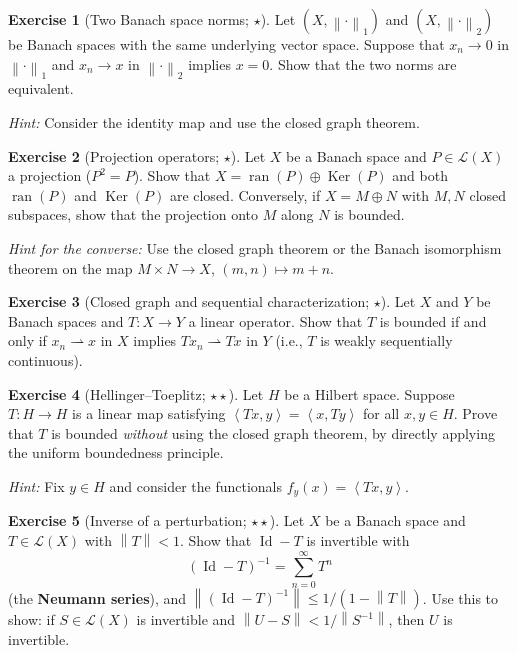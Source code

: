 \documentclass[a4paper,12pt]{book}
\DeclareMathOperator{\Id}{Id}
\DeclareMathOperator{\Ker}{Ker}
\DeclareMathOperator{\ran}{ran}
\newcommand{\norm}[1]{\left\| #1 \right\|}
\newcommand{\inner}[2]{\left\langle #1, #2 \right\rangle}
\newcommand{\weakto}{\rightharpoonup}
\theoremstyle{definition}
\newtheorem{exercise}{Exercise}[chapter]
\theoremstyle{plain}
\theoremstyle{remark}
\begin{document}
\begin{exercise}[Two Banach space norms; $\star$]\label{ex:two-norms}
Let $(X, \norm{\cdot}_1)$ and $(X, \norm{\cdot}_2)$ be Banach spaces with the same
underlying vector space. Suppose that $x_n \to 0$ in $\norm{\cdot}_1$ and
$x_n \to x$ in $\norm{\cdot}_2$ implies $x = 0$. Show that the two norms are
equivalent.

\noindent\textit{Hint:} Consider the identity map and use the closed graph theorem.
\end{exercise}

\begin{exercise}[Projection operators; $\star$]\label{ex:projection}
Let $X$ be a Banach space and $P \in \mathcal{L}(X)$ a projection ($P^2 = P$).
Show that $X = \ran(P) \oplus \Ker(P)$ and both $\ran(P)$ and $\Ker(P)$ are closed.
Conversely, if $X = M \oplus N$ with $M, N$ closed subspaces, show that the
projection onto $M$ along $N$ is bounded.

\noindent\textit{Hint for the converse:} Use the closed graph theorem or the
Banach isomorphism theorem on the map $M \times N \to X$, $(m,n) \mapsto m + n$.
\end{exercise}

\begin{exercise}[Closed graph and sequential characterization; $\star$]%
\label{ex:cgt-sequential}
Let $X$ and $Y$ be Banach spaces and $T \colon X \to Y$ a linear operator.
Show that $T$ is bounded if and only if $x_n \weakto x$ in $X$ implies
$Tx_n \weakto Tx$ in $Y$ (i.e., $T$ is weakly sequentially continuous).
\end{exercise}

\begin{exercise}[Hellinger--Toeplitz; $\star\star$]\label{ex:hellinger-toeplitz}
Let $H$ be a Hilbert space. Suppose $T \colon H \to H$ is a linear map satisfying
$\inner{Tx}{y} = \inner{x}{Ty}$ for all $x, y \in H$. Prove that $T$ is bounded
\emph{without} using the closed graph theorem, by directly applying the uniform
boundedness principle.

\noindent\textit{Hint:} Fix $y \in H$ and consider the functionals
$f_y(x) = \inner{Tx}{y}$.
\end{exercise}

\begin{exercise}[Inverse of a perturbation; $\star\star$]\label{ex:neumann-series}
Let $X$ be a Banach space and $T \in \mathcal{L}(X)$ with $\norm{T} < 1$. Show that
$\Id - T$ is invertible with
\[
  (\Id - T)^{-1} = \sum_{n=0}^{\infty} T^n
\]
(the \textbf{Neumann series}), and $\norm{(\Id - T)^{-1}} \leq 1/(1-\norm{T})$.
Use this to show: if $S \in \mathcal{L}(X)$ is invertible and $\norm{U - S} <
1/\norm{S^{-1}}$, then $U$ is invertible.
\end{exercise}
\end{document}
